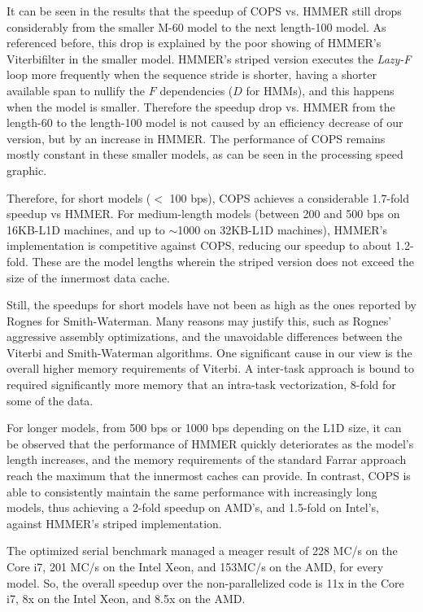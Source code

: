 It can be seen in the results that the speedup of COPS vs. HMMER still drops considerably from the smaller M-60 model to the next length-100 model. As referenced before, this drop is explained by the poor showing of HMMER's Viterbifilter in the smaller model. HMMER's striped version executes the \emph{Lazy-F} loop more frequently when the sequence stride is shorter, having a shorter available span to nullify the $F$ dependencies ($D$ for HMMs), and this happens when the model is smaller. Therefore the speedup drop vs. HMMER from the length-60 to the length-100 model is not caused by an efficiency decrease of our version, but by an increase in HMMER. The performance of COPS remains mostly constant in these smaller models, as can be seen in the processing speed graphic.

Therefore, for short models ($<$ 100 bps), COPS achieves a considerable 1.7-fold speedup vs HMMER. For medium-length models (between 200 and 500 bps on 16KB-L1D machines, and up to $\sim$1000 on 32KB-L1D machines), HMMER's implementation is competitive against COPS, reducing our speedup to about 1.2-fold. These are the model lengths wherein the striped version does not exceed the size of the innermost data cache. 

Still, the speedups for short models have not been as high as the ones reported by Rognes for Smith-Waterman. Many reasons may justify this, such as Rognes' aggressive assembly optimizations, and the unavoidable differences between the Viterbi and Smith-Waterman algorithms. One significant cause in our view is the overall higher memory requirements of Viterbi. A inter-task approach is bound to required significantly more memory that an intra-task vectorization, 8-fold for some of the data.

For longer models, from 500 bps or 1000 bps depending on the L1D size, it can be observed that the performance of HMMER quickly deteriorates as the model's length increases, and the memory requirements of the standard Farrar approach reach the maximum that the innermost caches can provide. In contrast, COPS is able to consistently maintain the same performance with increasingly long models, thus achieving a 2-fold speedup on AMD's, and 1.5-fold on Intel's, against HMMER's striped implementation.


The optimized serial benchmark managed a meager result of 228 MC/s on the Core i7, 201 MC/s on the Intel Xeon, and 153MC/s on the AMD, for every model. So, the overall speedup over the non-parallelized code is 11x in the Core i7, 8x on the Intel Xeon, and 8.5x on the AMD.




